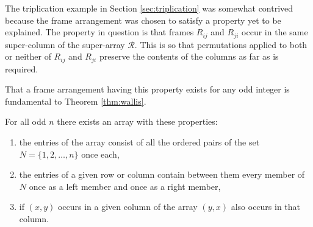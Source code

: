 The triplication example in Section \ref{sec:triplication} was somewhat contrived because the frame arrangement was chosen to satisfy a property yet to be explained.
The property in question is that frames $R_{ij}$ and $R_{ji}$ occur in the same super-column of the super-array $\mathcal{R}$.
This is so that permutations applied to both or neither of $R_{ij}$ and $R_{ji}$ preserve the contents of the columns as far as is required.

That a frame arrangement having this property exists for any odd integer is fundamental to Theorem \ref{thm:wallis}.

\begin{lemma}
For all odd $n$ there exists an array with these properties:
\begin{enumerate}
  \item{the entries of the array consist of all the ordered pairs of the set $N = \{1, 2, \ldots, n\}$ once each,}
  \item{the entries of a given row or column contain between them every member of $N$ once as a left member and once as a right member,}
  \item{if $(x,y)$ occurs in a given column of the array $(y,x)$ also occurs in that column.}
\end{enumerate}
\end{lemma}

